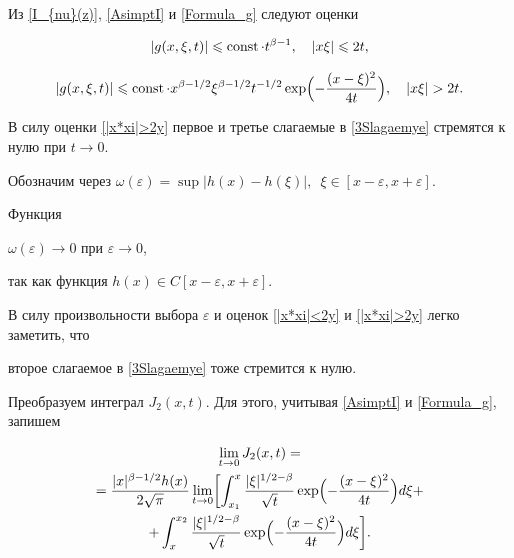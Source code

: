 Из \eqref{I_{nu}(z)}, \eqref{AsimptI} и \eqref{Formula_g} следуют оценки

\begin{equation}\label{|x*xi|<2y}

|g(x,\xi,t)|\leqslant \mathop{\rm const} \cdot t^{\beta-1}, \quad  |x\xi| \leqslant 2t,

\end{equation}

\begin{equation}\label{|x*xi|>2y}

|g(x,\xi,t)|\leqslant \mathop{\rm const}  \cdot x^{\beta-1/2} \xi^{\beta-1/2} t^{-1/2} \exp \Bigl({-\frac{(x-\xi)^2}{4t}}\Bigr), 

\quad  |x\xi|> 2t.

\end{equation}



В силу оценки \eqref{|x*xi|>2y} первое и третье слагаемые в \eqref{3Slagaemye} стремятся к нулю при $t \to 0.$



Обозначим через $\omega(\varepsilon)=\sup|h(x)-h(\xi)|,$ $\,\xi\in [x-\varepsilon, x+\varepsilon].$ 



Функция %

${\omega(\varepsilon)\to 0}$ при $\varepsilon\to 0$,

так как функция $h(x)\in C[x-\varepsilon, x+\varepsilon]$.

В силу произвольности выбора $\varepsilon$ и оценок  \eqref{|x*xi|<2y} и  \eqref{|x*xi|>2y} легко заметить, что    

второе слагаемое в \eqref{3Slagaemye} тоже стремится к нулю.



Преобразуем интеграл $J_2(x,t).$  Для этого, учитывая \eqref{AsimptI} и \eqref{Formula_g}, запишем

\begin{multline}

\lim_{t \to 0} J_2(x,t)=

\\

=\frac{|x|^{\beta-1/2} h(x)}{2\sqrt{\pi}} \lim_{t \to 0}

\biggl[ \int _{x_1}^{x}

\frac{|\xi|^{1/2-\beta}}{\sqrt{t}}\exp\Bigl({-\frac{(x-\xi)^2}{4t}}\Bigr)d\xi+

\\

+

\int _{x}^{x_2}

\frac{|\xi|^{1/2-\beta}}{\sqrt{t}}\exp\Bigl({-\frac{(x-\xi)^2}{4t}}\Bigr)d\xi  \biggr].

\end{multline}

